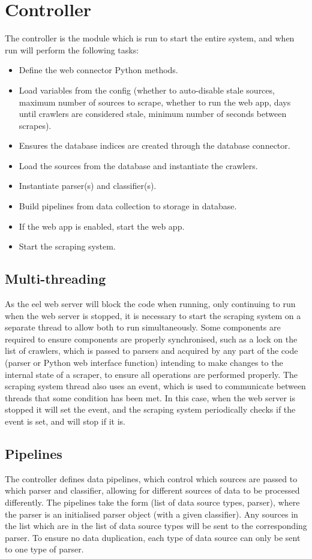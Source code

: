 \documentclass{l4proj}
\begin{document}
\section{Controller}
The controller is the module which is run to start the entire system, and when run will perform the following tasks:
\begin{itemize}
    \item Define the web connector Python methods.
    \item Load variables from the config (whether to auto-disable stale sources, maximum number of sources to scrape, whether to run the web app, days until crawlers are considered stale, minimum number of seconds between scrapes).
    \item Ensures the database indices are created through the database connector.
    \item Load the sources from the database and instantiate the crawlers.
    \item Instantiate parser(s) and classifier(s).
    \item Build pipelines from data collection to storage in database.
    \item If the web app is enabled, start the web app.
    \item Start the scraping system.
\end{itemize}

\subsection{Multi-threading}
As the eel web server will block the code when running, only continuing to run when the web server is stopped, it is necessary to start the scraping system on a separate thread to allow both to run simultaneously. Some components are required to ensure components are properly synchronised, such as a lock on the list of crawlers, which is passed to parsers and acquired by any part of the code (parser or Python web interface function) intending to make changes to the internal state of a scraper, to ensure all operations are performed properly. The scraping system thread also uses an event, which is used to communicate between threads that some condition has been met. In this case, when the web server is stopped it will set the event, and the scraping system periodically checks if the event is set, and will stop if it is. 

\subsection{Pipelines}
The controller defines data pipelines, which control which sources are passed to which parser and classifier, allowing for different sources of data to be processed differently. The pipelines take the form (list of data source types, parser), where the parser is an initialised parser object (with a given classifier). Any sources in the list which are in the list of data source types will be sent to the corresponding parser. To ensure no data duplication, each type of data source can only be sent to one type of parser.
\end{document}
